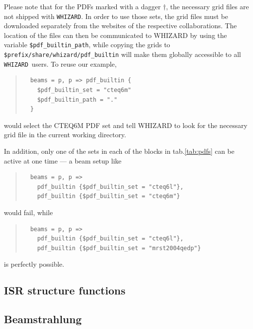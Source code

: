 \documentclass[12pt]{book}
\newcommand{\whizard}{\texttt{WHIZARD}}
\begin{document}
Please note that for the PDFs marked with a dagger $\dagger$, the necessary grid
files are not shipped with \whizard. In order to use those sets, the grid files
must be downloaded separately from the websites of the respective collaborations.
The location of the files can then be communicated to WHIZARD by using the
variable \verb?$pdf_builtin_path?, while
copying the grids to \verb?$prefix/share/whizard/pdf_builtin? will make them
globally accessible to all \whizard\ users. To reuse our example, 
%
\begin{quote}
\begin{footnotesize}
\begin{verbatim}
  beams = p, p => pdf_builtin {
    $pdf_builtin_set = "cteq6m"
    $pdf_builtin_path = "."
  }
\end{verbatim}
\end{footnotesize}
\end{quote}
%
would select the CTEQ6M PDF set and tell WHIZARD to look for the necessary grid
file in the current working directory.

In addition, only one of the sets in each of the blocks in tab.\ref{tab:pdfs}
can be active at one time --- a beam setup like
%
\begin{quote}
\begin{footnotesize}
\begin{verbatim}
  beams = p, p =>
    pdf_builtin {$pdf_builtin_set = "cteq6l"},
    pdf_builtin {$pdf_builtin_set = "cteq6m"}
\end{verbatim}
\end{footnotesize}
\end{quote}
%
would fail, while
\begin{quote}
\begin{footnotesize}
\begin{verbatim}
  beams = p, p =>
    pdf_builtin {$pdf_builtin_set = "cteq6l"},
    pdf_builtin {$pdf_builtin_set = "mrst2004qedp"}
\end{verbatim}
\end{footnotesize}
\end{quote}
%
is perfectly possible.

\subsection{ISR structure functions}

\subsection{Beamstrahlung}
\end{document}
